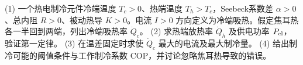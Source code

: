 (1) 一个热电制冷元件冷端温度 \(T_c>0\)、热端温度 \(T_h>T_c\)，Seebeck系数差 \(\alpha>0\)、总内阻 \(R>0\)、被动热导 \(K>0\)。电流 \(I>0\) 方向定义为冷端吸热。假定焦耳热各一半回到两端，列出冷端吸热率 \(\dot Q_c\)。
(2) 求热端放热率 \(\dot Q_h\) 及供电功率 \(P_{\rm el}\)，验证第一定律。
(3) 在温差固定时求使 \(\dot Q_c\) 最大的电流及最大制冷量。
(4) 给出制冷可能的阈值条件与工作制冷系数 COP，并讨论忽略焦耳热导致的错误。
